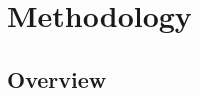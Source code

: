 \documentclass[journal,onecolumn]{IEEEtran}
\begin{document}
	\section{Methodology}
	
		\subsection{Overview}
		
%		
\end{document}
